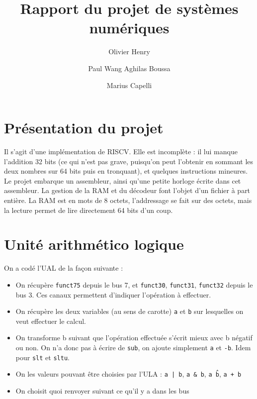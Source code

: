 \documentclass{article}
\author{
  Olivier Henry
  \and
  Paul Wang  
  Aghilas Boussa
  \and
  Marius Capelli
}
\date{}
\title{ Rapport du projet de systèmes numériques}
\begin{document}
\maketitle

\newpage

\section{Présentation du projet}

Il s'agit d'une implémentation de RISCV. Elle est incomplète : il lui manque l'addition 32 bits (ce qui n'est pas grave, puisqu'on peut l'obtenir en sommant les deux nombres sur 64 bits puis en tronquant), et quelques instructions mineures. Le projet embarque un assembleur, ainsi qu'une petite horloge écrite dans cet assembleur. La gestion de la RAM et du décodeur font l'objet d'un fichier à part entière. La RAM est en mots de 8 octets, l'addressage se fait sur des octets, mais la lecture permet de lire directement 64 bits d'un coup. 

\section{Unité arithmético logique}

On a codé l'UAL de la façon suivante : 
\begin{itemize}
    \item On récupère \texttt{funct75} depuis le bus 7, et \texttt{funct30}, \texttt{funct31}, \texttt{funct32} depuis le bus 3. Ces canaux permettent d'indiquer l'opération à effectuer. 
    \item On récupère les deux variables (au sens de carotte) \texttt{a} et \texttt{b} sur lesquelles on veut effectuer le calcul. 
    \item On transforme b suivant que l'opération effectuée s'écrit mieux avec b négatif ou non. On n'a donc pas à écrire de \texttt{sub}, on ajoute simplement \texttt{a} et \texttt{-b}. Idem pour \texttt{slt} et \texttt{sltu}.
    \item On les valeurs pouvant être choisies par l'ULA : \texttt{a | b}, \texttt{a \& b}, \texttt{a \^ b}, \texttt{a + b}
    \item On choisit quoi renvoyer suivant ce qu'il y a dans les bus 
\end{itemize}
\end{document}
